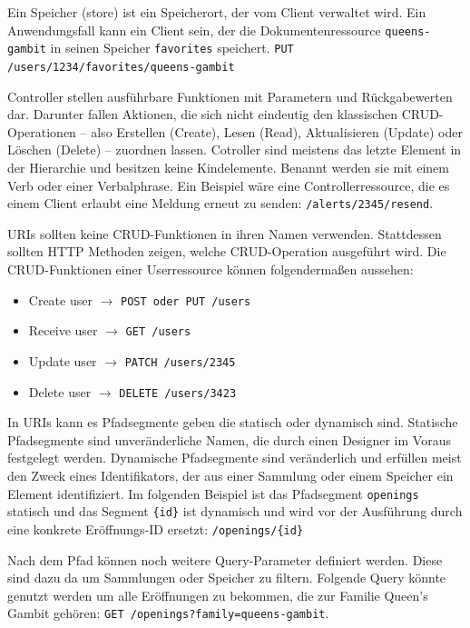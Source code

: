 Ein Speicher (store) ist ein Speicherort, der vom Client verwaltet wird. Ein Anwendungsfall kann ein Client sein, der die Dokumentenressource \lstinline{queens-gambit} in seinen Speicher \lstinline{favorites} speichert. \lstinline{PUT /users/1234/favorites/queens-gambit}

Controller stellen ausführbare Funktionen mit Parametern und Rückgabewerten dar.
Darunter fallen Aktionen, die sich nicht eindeutig den klassischen CRUD-Operationen – also Erstellen (Create), Lesen (Read), Aktualisieren (Update) oder Löschen (Delete) – zuordnen lassen.
Cotroller sind meistens das letzte Element in der Hierarchie und besitzen keine Kindelemente. Benannt werden sie mit einem Verb oder einer Verbalphrase. Ein Beispiel wäre eine Controllerressource, die es einem Client erlaubt eine Meldung erneut zu senden: \lstinline{/alerts/2345/resend}.

\ac{URI}s sollten keine CRUD-Funktionen in ihren Namen verwenden. Stattdessen sollten HTTP Methoden zeigen, welche CRUD-Operation ausgeführt wird. Die CRUD-Funktionen einer Userressource können folgendermaßen aussehen:

\begin{itemize}
  \item Create user $\rightarrow$ \lstinline{POST oder PUT /users}
  \item Receive user $\rightarrow$ \lstinline{GET /users}
  \item Update user $\rightarrow$ \lstinline{PATCH /users/2345}
  \item Delete user $\rightarrow$ \lstinline{DELETE /users/3423}
\end{itemize}

In \ac{URI}s kann es Pfadsegmente geben die statisch oder dynamisch sind. Statische Pfadsegmente sind unveränderliche Namen, die durch einen Designer im Voraus festgelegt werden. Dynamische Pfadsegmente sind veränderlich und erfüllen meist den Zweck eines Identifikators, der aus einer Sammlung oder einem Speicher ein Element identifiziert. Im folgenden Beispiel ist das Pfadsegment \lstinline{openings} statisch und das Segment \lstinline|{id}| ist dynamisch und wird vor der Ausführung durch eine konkrete Eröffnungs-ID ersetzt: \lstinline|/openings/{id}|

Nach dem Pfad können noch weitere Query-Parameter definiert werden. Diese sind dazu da um Sammlungen oder Speicher zu filtern. Folgende Query könnte genutzt werden um alle Eröffnungen zu bekommen, die zur Familie Queen's Gambit gehören: \lstinline{GET /openings?family=queens-gambit}.
\cite{masse_rest_2012}


